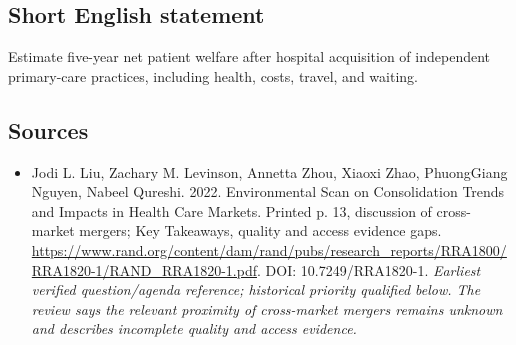 \documentclass[11pt]{article}
\begin{document}
\subsection{Short English statement}
Estimate five-year net patient welfare after hospital acquisition of independent primary-care practices, including health, costs, travel, and waiting.

\subsection{Sources}
\begin{itemize}\raggedright
\item[\textnormal{[S1]}]\hypertarget{source:30007723:1}{} Jodi L. Liu, Zachary M. Levinson, Annetta Zhou, Xiaoxi Zhao, PhuongGiang Nguyen, Nabeel Qureshi. 2022. Environmental Scan on Consolidation Trends and Impacts in Health Care Markets. Printed p. 13, discussion of cross-market mergers; Key Takeaways, quality and access evidence gaps.
\url{https://www.rand.org/content/dam/rand/pubs/research_reports/RRA1800/RRA1820-1/RAND_RRA1820-1.pdf}.
DOI: 10.7249/RRA1820-1.
{\small\textit{Earliest verified question/agenda reference; historical priority qualified below. The review says the relevant proximity of cross-market mergers remains unknown and describes incomplete quality and access evidence.}}
\end{itemize}
\end{document}
